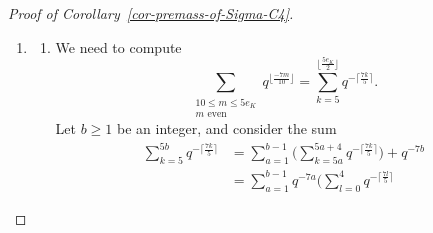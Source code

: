 \documentclass[11pt]{amsart}
\theoremstyle{theorem}
\theoremstyle{example}
\theoremstyle{definition}
\numberwithin{theorem}{section}
\numberwithin{theorem}{section}
\begin{document}
\begin{proof}[Proof of Corollary~\ref{cor-premass-of-Sigma-C4}]
\begin{enumerate}
\begin{enumerate}
\begin{align*}
            \sum_{\substack{5e_K + 3 \leq m \leq 8e_K - 3d_{(-1)} \\ m\equiv 2e_K \pmod{6}}} q^{\frac{4e_K - 5m}{6}} &= \sum_{k=\lfloor \frac{e_K}{2}\rfloor + 1}^{e_K - \frac{1}{2}d_{(-1)}} q^{-e_K - 5k}
            \\
            &= \mathbbm{1}_{d_{(-1)} < e_K}\frac{q^{-5\lfloor\frac{e_K}{2}\rfloor - e_K} - q^{\frac{5}{2}d_{(-1)} - 6e_K}}{q^5-1},
            \end{align*}
            so the contribution is 
            $$
            \mathbbm{1}_{d_{(-1)} < e_K} \cdot \frac{(q-1)(q^{-5\lfloor\frac{e_K}{2}\rfloor - e_K - 1} - q^{\frac{5}{2}d_{(-1)} - 6e_K - 1})}{q^5-1}.
            $$
            \item This is already in closed form. 
            \item The substitution $m = 2e_K + 6k$ gives
            \begin{align*}
                \sum_{\substack{8e_K - 3d_{(-1)} + 12\leq m \leq 8e_K \\ m \equiv 2e_K \pmod{6}}} q^{\frac{4e_K - 5m}{6}} &= \sum_{k=e_K - \frac{1}{2}d_{(-1)} + 2}^{e_K}q^{-e_K - 5k}
                \\
                &=\mathbbm{1}_{d_{(-1)} \geq 4}\cdot \frac{q^{\frac{5}{2}d_{(-1)} - 6e_K-5} - q^{-6e_K}}{q^5 - 1}. 
            \end{align*}
            Therefore, the contribution is 
            $$
            \frac{1}{2} \cdot \mathbbm{1}_{d_{(-1)} \geq 4}\cdot \frac{(q-1)(q^{\frac{5}{2}d_{(-1)} - 6e_K - 6} - q^{-6e_K-1})}{q^5-1}.
            $$
        \end{enumerate}
        \item \begin{enumerate}
            \item We need to compute 
            $$
            \sum_{\substack{10 \leq m \leq 5e_K \\ \text{$m$ even}}} q^{\lfloor \frac{-7m}{10}\rfloor} = \sum_{k=5}^{\lfloor \frac{5e_K}{2}\rfloor} q^{- \lceil \frac{7k}{5}\rceil}.
            $$
            Let $b\geq 1$ be an integer, and consider the sum 
            \begin{align*}
            \sum_{k=5}^{5b} q^{-\lceil \frac{7k}{5}\rceil} &= \sum_{a=1}^{b-1}\Big(
                \sum_{k=5a}^{5a+4}q^{-\lceil \frac{7k}{5}\rceil} 
            \Big) + q^{-7b}
            \\
            &= \sum_{a=1}^{b-1}q^{-7a}\Big(
                \sum_{l=0}^4q^{-\lceil \frac{7l}{5}\rceil}

\end{align*}
\end{enumerate}
\end{enumerate}
\end{proof}
\end{document}
